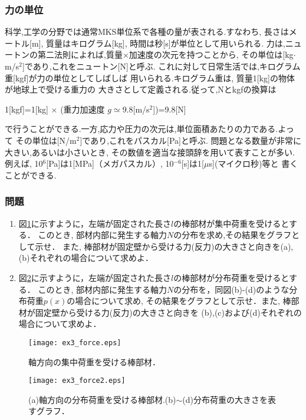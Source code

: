 \documentclass[10pt,a4j]{jarticle}
\begin{document}
\subsubsection{力の単位}
科学,工学の分野では通常MKS単位系で各種の量が表される.すなわち, 
長さはメートル[m], 質量はキログラム[kg], 時間は秒[s]が単位として用いられる.
力は,ニュートンの第二法則によれば,質量×加速度の次元を持つことから, 
その単位は[kg$\cdot$m/s$^2$]であり,これをニュートン[N]と呼ぶ.
これに対して日常生活では,キログラム重[kgf]が力の単位としてしばしば
用いられる.キログラム重は, 質量1[kg]の物体が地球上で受ける重力の
大きさとして定義される.従って,Nとkgfの換算は
\begin{center}
	1[kgf]=1[kg] $\times$ (重力加速度  $g\simeq$9.8[m/s$^2$])=9.8[N]
\end{center}
で行うことができる.一方,応力や圧力の次元は,単位面積あたりの力である.よって
その単位は[N/m$^2$]であり,これをパスカル[Pa]と呼ぶ.
問題となる数量が非常に大きい,あるいは小さいとき,
その数値を適当な接頭辞を用いて表すことが多い.例えば,
10$^6$[Pa]は1[MPa]（メガパスカル）, 10$^{-6}$[s]は1[$\mu$s](マイクロ秒)等と
書くことができる.
\subsubsection{問題}
\begin{enumerate}
\item
図\ref{fig:fig3}に示すように，左端が固定された長さ$l$の棒部材が集中荷重を受けるとする．
このとき, 部材内部に発生する軸力$N$の分布を求め,その結果をグラフとして示せ．
また, 棒部材が固定壁から受ける力(反力)の大きさと向きを(a),(b)それぞれの場合について求めよ．
\item
図\ref{fig:fig3_2}に示すように，左端が固定された長さ$l$の棒部材が分布荷重を受けるとする．
このとき, 部材内部に発生する軸力$N$の分布を，同図(b)-(d)のような分布荷重$p(x)$の場合について求め,
その結果をグラフとして示せ．また, 棒部材が固定壁から受ける力(反力)の大きさと向きを
(b),(c)および(d)それぞれの場合について求めよ．
\end{enumerate}
\begin{figure}[h]
	\begin{center}
	\texttt{[image: ex3\_force.eps]} 
	\end{center}
	\caption{軸方向の集中荷重を受ける棒部材．} 
	\label{fig:fig3}
\end{figure}
\begin{figure}[h]
	\begin{center}
	\texttt{[image: ex3\_force2.eps]} 
	\end{center}
	\caption{(a)軸方向の分布荷重を受ける棒部材.(b)$\sim$(d)分布荷重の大きさを表すグラフ．} 
	\label{fig:fig3_2}
\end{figure}
\end{document}
